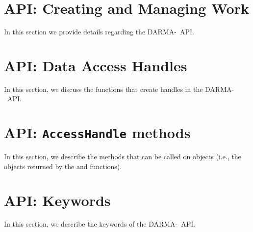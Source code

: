 
\lstMakeShortInline[style=CppCodeInlineStyle]{\|}

\section{API: Creating and Managing Work}
In this section we provide details regarding the \gls{DARMA}-\specVersion\ \gls{API}.

\clearpage

\clearpage

\clearpage

\clearpage

\clearpage

\section{API: Data Access Handles}

In this section, we discuss the functions that create \glspl{handle}
in the \gls{DARMA}-\specVersion\ \gls{API}.

\clearpage

\clearpage

\section{API: \texttt{AccessHandle} methods}
In this section, we describe the methods that can be called 
on  objects (i.e., the objects returned by the 
 and  functions).



\clearpage

\clearpage

\clearpage

\clearpage

\clearpage

\clearpage

\clearpage

\clearpage

\section{API: Keywords}

In this section, we describe the keywords of the \gls{DARMA}-\specVersion\ \gls{API}. 




\lstDeleteShortInline{\|}

